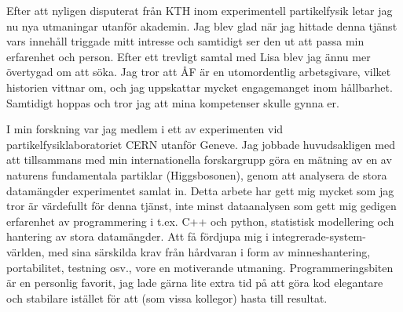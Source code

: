 \documentclass[11pt, a4paper]{../awesome-cv} %
\begin{document}
\sloppy %

\makecvheader %

\makelettertitle %


\begin{cvletter}
\vspace{.15cm}

Efter att nyligen disputerat från KTH inom experimentell partikelfysik letar jag nu nya utmaningar utanför akademin.
Jag blev glad när jag hittade denna tjänst vars innehåll triggade mitt intresse och samtidigt ser den ut att passa min erfarenhet och person.
Efter ett trevligt samtal med Lisa blev jag ännu mer övertygad om att söka. 
Jag tror att ÅF är en utomordentlig arbetsgivare, vilket historien vittnar om, och jag uppskattar mycket engagemanget inom hållbarhet.
Samtidigt hoppas och tror jag att mina kompetenser skulle gynna er. 


I min forskning var jag medlem i ett av experimenten vid partikelfysiklaboratoriet CERN utanför Geneve.
Jag jobbade huvudsakligen med att tillsammans med min internationella forskargrupp göra en mätning av en av naturens fundamentala partiklar (Higgsbosonen), genom att analysera de stora datamängder experimentet samlat in. %
Detta arbete har gett mig mycket som jag tror är värdefullt för denna tjänst, inte minst dataanalysen som gett mig gedigen erfarenhet av programmering i t.ex. C++ och python, statistisk modellering och hantering av stora datamängder.
Att få fördjupa mig i integrerade-system-världen, med sina särskilda krav från hårdvaran i form av minneshantering, portabilitet, testning osv., vore en motiverande utmaning. %
Programmeringsbiten är en personlig favorit, jag lade gärna lite extra tid på att göra kod elegantare och stabilare istället för att (som vissa kollegor) hasta till resultat.


\end{cvletter}
\end{document}

